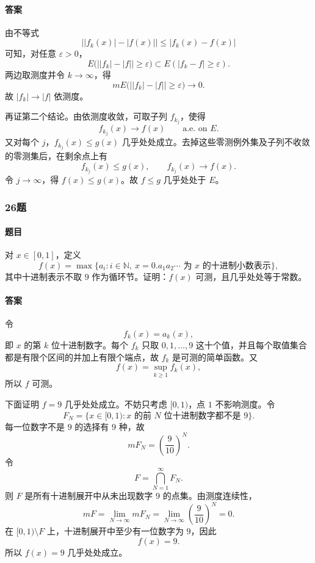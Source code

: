 \documentclass{article}
\newcommand{\eps}{\varepsilon}
\begin{document}
\paragraph{答案} 由不等式
\[
 \big||f_k(x)|-|f(x)|\big|\le |f_k(x)-f(x)|
\]
可知，对任意 $\eps>0$，
\[
 E\big(\big||f_k|-|f|\big|\ge\eps\big)
\subset E(|f_k-f|\ge\eps).
\]
两边取测度并令 $k\to\infty$，得
\[
 mE\big(\big||f_k|-|f|\big|\ge\eps\big)\to0.
\]
故 $|f_k|\to |f|$ 依测度。

再证第二个结论。由依测度收敛，可取子列 $f_{k_j}$，使得
\[
 f_{k_j}(x)\to f(x)\qquad \text{a.e. on }E.
\]
又对每个 $j$，$f_{k_j}(x)\le g(x)$ 几乎处处成立。去掉这些零测例外集及子列不收敛的零测集后，在剩余点上有
\[
 f_{k_j}(x)\le g(x),\qquad f_{k_j}(x)\to f(x).
\]
令 $j\to\infty$，得 $f(x)\le g(x)$。故 $f\le g$ 几乎处处于 $E$。

\subsubsection*{26题}
\paragraph{题目} 对 $x\in[0,1]$，定义
\[
 f(x)=\max\{a_i:i\in\mathbb{N},\ x=0.a_1a_2\cdots\text{ 为 }x\text{ 的十进制小数表示}\},
\]
其中十进制表示不取 $9$ 作为循环节。证明：$f(x)$ 可测，且几乎处处等于常数。

\paragraph{答案} 令
\[
 f_k(x)=a_k(x),
\]
即 $x$ 的第 $k$ 位十进制数字。每个 $f_k$ 只取 $0,1,\ldots,9$ 这十个值，并且每个取值集合都是有限个区间的并加上有限个端点，故 $f_k$ 是可测的简单函数。又
\[
 f(x)=\sup_{k\ge1}f_k(x),
\]
所以 $f$ 可测。

下面证明 $f=9$ 几乎处处成立。不妨只考虑 $[0,1)$，点 $1$ 不影响测度。令
\[
 F_N=\{x\in[0,1):x\text{ 的前 }N\text{ 位十进制数字都不是 }9\}.
\]
每一位数字不是 $9$ 的选择有 $9$ 种，故
\[
 mF_N=\left(\frac9{10}\right)^N.
\]
令
\[
 F=\bigcap_{N=1}^{\infty}F_N.
\]
则 $F$ 是所有十进制展开中从未出现数字 $9$ 的点集。由测度连续性，
\[
 mF=\lim_{N\to\infty}mF_N=\lim_{N\to\infty}\left(\frac9{10}\right)^N=0.
\]
在 $[0,1)\setminus F$ 上，十进制展开中至少有一位数字为 $9$，因此
\[
 f(x)=9.
\]
所以 $f(x)=9$ 几乎处处成立。
\end{document}
